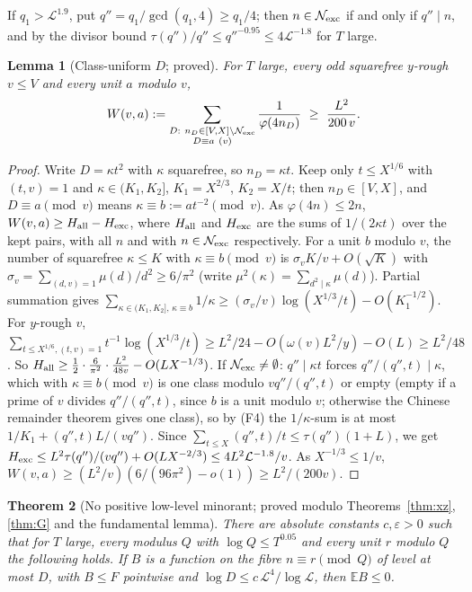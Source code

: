 \documentclass[11pt,reqno]{amsart}
\newtheorem{theorem}{Theorem}[section]
\newtheorem{lemma}[theorem]{Lemma}
\theoremstyle{definition}
\newcommand{\Lc}{\mathcal L}
\newcommand{\E}{\mathbb E}
\begin{document}
If $q_1>\Lc^{1.9}$, put $q''=q_1/\gcd(q_1,4)\ge q_1/4$; then $n\in\mathcal N_{\rm exc}$ if
and only if $q''\mid n$, and by the divisor bound
$\tau(q'')/q''\le q''^{-0.95}\le4\Lc^{-1.8}$ for $T$ large.

\begin{lemma}[Class-uniform $D$; proved]\label{lem:cuD}
For $T$ large, every odd squarefree $y$-rough $v\le V$ and every unit $a$
modulo $v$,
\[
 W(v,a):=\sum_{\substack{D:\ n_D\in[V,X]\setminus\mathcal N_{\rm exc}\\ D\equiv a\ (v)}}\frac1{\varphi(4n_D)}\ \ge\ \frac{L^2}{200\,v}.
\]
\end{lemma}

\begin{proof}
Write $D=\kappa t^2$ with $\kappa$ squarefree, so $n_D=\kappa t$.  Keep only $t\le X^{1/6}$
with $(t,v)=1$ and $\kappa\in(K_1,K_2]$, $K_1=X^{2/3}$, $K_2=X/t$; then
$n_D\in[V,X]$, and $D\equiv a\pmod v$ means $\kappa\equiv b:=at^{-2}\pmod v$.  As
$\varphi(4n)\le2n$, $W(v,a)\ge H_{\rm all}-H_{\rm exc}$, where $H_{\rm all}$ and
$H_{\rm exc}$ are the sums of $1/(2\kappa t)$ over the kept pairs, with all $n$
and with $n\in\mathcal N_{\rm exc}$ respectively.  For a unit $b$ modulo $v$, the
number of squarefree $\kappa\le K$ with $\kappa\equiv b\pmod v$ is
$\sigma_vK/v+O(\sqrt K)$ with $\sigma_v=\sum_{(d,v)=1}\mu(d)/d^2\ge6/\pi^2$ (write
$\mu^2(\kappa)=\sum_{d^2\mid\kappa}\mu(d)$).  Partial summation gives
$\sum_{\kappa\in(K_1,K_2],\,\kappa\equiv b}1/\kappa\ge(\sigma_v/v)\log(X^{1/3}/t)-O(K_1^{-1/2})$.  For
$y$-rough $v$,
$\sum_{t\le X^{1/6},(t,v)=1}t^{-1}\log(X^{1/3}/t)\ge L^2/24-O(\omega(v)L^2/y)-O(L)\ge L^2/48$.
So $H_{\rm all}\ge\frac12\cdot\frac6{\pi^2}\cdot\frac{L^2}{48v}-O(LX^{-1/3})$.  If
$\mathcal N_{\rm exc}\ne\emptyset$: $q''\mid\kappa t$ forces $q''/(q'',t)\mid\kappa$, which with
$\kappa\equiv b\pmod v$ is one class modulo $vq''/(q'',t)$ or empty (empty if
a prime of $v$ divides $q''/(q'',t)$, since $b$ is a unit modulo $v$; otherwise
the Chinese remainder theorem gives one class), so by (F4)
the $1/\kappa$-sum is at most $1/K_1+(q'',t)L/(vq'')$.  Since
$\sum_{t\le X}(q'',t)/t\le\tau(q'')(1+L)$, we get
$H_{\rm exc}\le L^2\tau(q'')/(vq'')+O(LX^{-2/3})\le4L^2\Lc^{-1.8}/v$.  As
$X^{-1/3}\le1/v$, $W(v,a)\ge(L^2/v)(6/(96\pi^2)-o(1))\ge L^2/(200v)$.
\end{proof}

\begin{theorem}[No positive low-level minorant; proved modulo Theorems~\ref{thm:xz}, \ref{thm:G} and the fundamental lemma]\label{thm:ceiling}
There are absolute constants $c,\varepsilon>0$ such that for $T$ large, every modulus
$Q$ with $\log Q\le T^{0.05}$ and every unit $r$ modulo $Q$ the following holds.
If $B$ is a function on the fibre $n\equiv r\pmod Q$ of level at most $D$, with
$B\le F$ pointwise and $\log D\le c\,\Lc^4/\log\Lc$, then $\E B\le0$.
\end{theorem}
\end{document}
